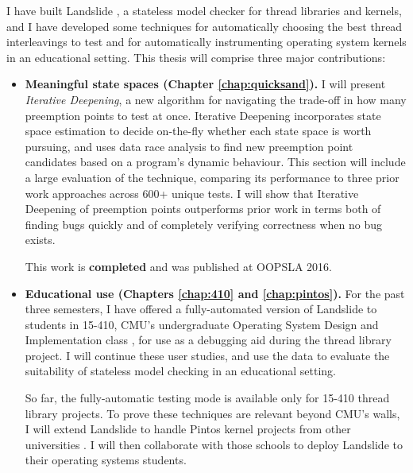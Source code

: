 \documentclass[12pt]{cmuthesis}
\begin{document}
I have built Landslide \cite{landslide}, a stateless model checker for thread libraries and kernels,
and I have developed some techniques for automatically choosing the best thread interleavings to test
and for automatically instrumenting operating system kernels in an educational setting.
This thesis will comprise three major contributions:

\begin{itemize}
	\item {\bf Meaningful state spaces (Chapter \ref{chap:quicksand}).}
		I will present {\em Iterative Deepening}, a new algorithm for navigating the trade-off in how many preemption points to test at once.
		Iterative Deepening incorporates state space estimation \cite{estimation} to decide on-the-fly whether each state space is worth pursuing, and uses data race analysis \cite{tsan} to find new preemption point candidates based on a program's dynamic behaviour.
		This section will include a large evaluation of the technique, comparing its performance to three prior work approaches across 600+ unique tests.
		I will show that Iterative Deepening of preemption points outperforms prior work in terms both of finding bugs quickly and of completely verifying correctness when no bug exists.

		This work is {\bf completed} and was published at OOPSLA 2016.
	\item {\bf Educational use (Chapters \ref{chap:410} and \ref{chap:pintos}).}
		For the past three semesters, I have offered a fully-automated version of Landslide to students in 15-410, CMU's undergraduate Operating System Design and Implementation class \cite{kspec,thrlib}, for use as a debugging aid during the thread library project.
		I will continue these user studies, and use the data to evaluate the suitability of stateless model checking in an educational setting.

		So far, the fully-automatic testing mode is available only for 15-410 thread library projects.
		To prove these techniques are relevant beyond CMU's walls, I will extend Landslide to handle Pintos kernel projects from other universities \cite{pintos}.
		I will then collaborate with those schools to deploy Landslide to their operating systems students.


\end{itemize}
\end{document}
